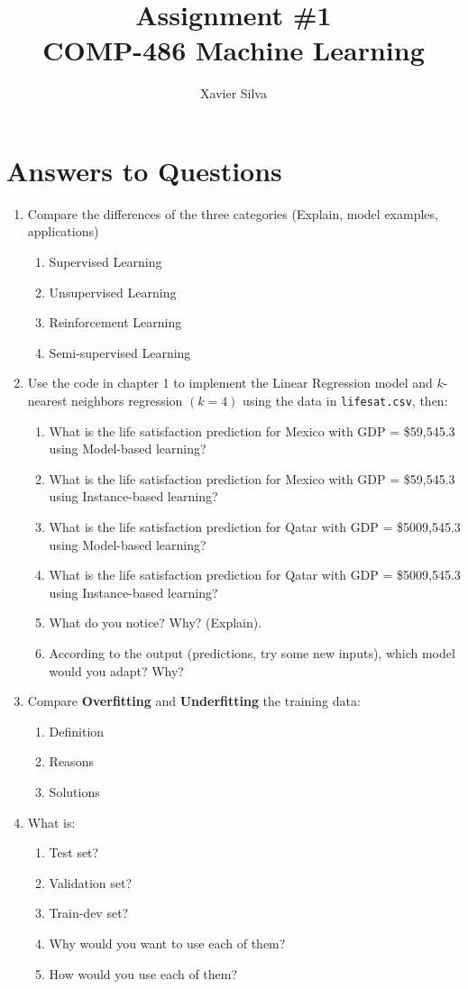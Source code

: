 \documentclass[a4paper,10pt]{article}
\title{Assignment \#1 \\ \large COMP-486 Machine Learning}
\author{Xavier Silva}
\begin{document}
\maketitle
\section{Answers to Questions}
\begin{enumerate}
	\item Compare the differences of the three categories (Explain, model examples, applications)
	\begin{enumerate}
		\item Supervised Learning
		\item Unsupervised Learning
		\item Reinforcement Learning
		\item Semi-supervised Learning
	\end{enumerate}
	
	\item Use the code in chapter 1 to implement the Linear Regression model and \( k \)-nearest neighbors regression \( (k=4) \) using the data in \texttt{lifesat.csv}, then:
	\begin{enumerate}
		\item What is the life satisfaction prediction for Mexico with GDP = \$59,545.3 using Model-based learning?
		\item What is the life satisfaction prediction for Mexico with GDP = \$59,545.3 using Instance-based learning?
		\item What is the life satisfaction prediction for Qatar with GDP = \$5009,545.3 using Model-based learning?
		\item What is the life satisfaction prediction for Qatar with GDP = \$5009,545.3
		using Instance-based learning?
		\item What do you notice? Why? (Explain).
		\item According to the output (predictions, try some new inputs), which model would you adapt? Why?
	\end{enumerate}
	
	\item Compare \textbf{Overfitting} and \textbf{Underfitting} the training data:
	\begin{enumerate}
		\item Definition
		\item Reasons
		\item Solutions
	\end{enumerate}
	
	\item What is:
	\begin{enumerate}
		\item Test set?
		\item Validation set?
		\item Train-dev set?
		\item Why would you want to use each of them?
		\item How would you use each of them?
	\end{enumerate}
\end{enumerate}
	
\end{document}

